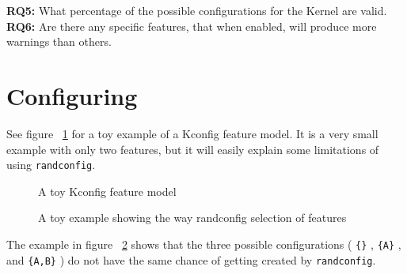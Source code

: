 \documentclass[a4paper,11pt]{report}
\newcommand{\textcode}[1]{
    \fboxsep=1pt
    \texttt{\colorbox{gray!20}{#1}}
}
\newcommand{\figa}{
    \begin{figure}[!htpb]
    \centering
}
\newcommand{\figb}[2]{
    \caption{#1}
    \label{#2}
    \end{figure}
}
\begin{document}
\textbf{RQ5:} What percentage of the possible configurations for the Kernel are 
valid. 
\\


\textbf{RQ6:} Are there any specific features, that when enabled, will produce 
more warnings than others. 
\\


\section{Configuring}

See figure ~\ref{randconfigtoy} for a toy example of a Kconfig feature model. 
It is a very small example with only two features, but it will easily explain 
some limitations of using \texttt{randconfig}.

\figa
    
\figb{A toy Kconfig feature model}{randconfigtoy}

\figa
\figb{A toy example showing the way randconfig selection of 
    features}{randconfigtoy50}

The example in figure ~\ref{randconfigtoy50} shows that the three possible 
configurations (\textcode{\{\}}, \textcode{\{A\}}, and \textcode{\{A,B\}}) do 
not have the same chance of getting created by \texttt{randconfig}.
\end{document}
